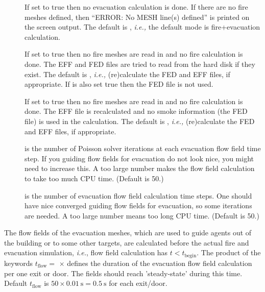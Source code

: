 \documentclass[12pt,a4paper,final,twoside]{stylevk}
\begin{document}
\begin{description}
%
\item[] If set to true then no evacuation
  calculation is done.  If there are no fire meshes defined, then
  ``ERROR: No MESH line(s) defined'' is printed on the screen output.
  The default is , \emph{i.e.,} the default mode is
  fire+evacuation calculation.
%
\item[] If set to true then no fire meshes
  are read in and no fire calculation is done.  The EFF and FED files
  are tried to read from the hard disk if they exist.  The default is
  , \emph{i.e.,} (re)calculate the FED and EFF files,
  if appropriate.  If  is also set true then
  the FED file is not used.
%
\item[] If set to true then no fire meshes
  are read in and no fire calculation is done.  The EFF file is
  recalculated and no smoke information (the FED file) is used in the
  calculation.  The default is , \emph{i.e.,}
  (re)calculate the FED and EFF files, if appropriate.
%
\item[] is the number of Poisson
  solver iterations at each evacuation flow field time step.  If you
  guiding flow fields for evacuation do not look nice, you might need
  to increase this.  A too large number makes the flow field
  calculation to take too much CPU time.  (Default is 50.)
%
\item[] is the number of evacuation flow
  field calculation time steps.  One should have nice converged
  guiding flow fields for evacuation, so some iterations are needed.
  A too large number means too long CPU time.  (Default is 50.)
%
\end{description}

The flow fields of the evacuation meshes, which are used to guide
agents out of the building or to some other targets, are calculated
before the actual fire and evacuation simulation, \emph{i.e.}, flow
field calculation has $ t < t_\textrm{begin}$.  The product of the
keywords $t_\mathrm{flow}=$  $\times$
 defines the duration of the evacuation
flow field calculation per one exit or door. The fields should reach
'steady-state' during this time.  Default $t_\mathrm{flow}$ is
$50\times 0.01~\mathrm{s} = 0.5~\mathrm{s}$ for each exit/door.
\end{document}
